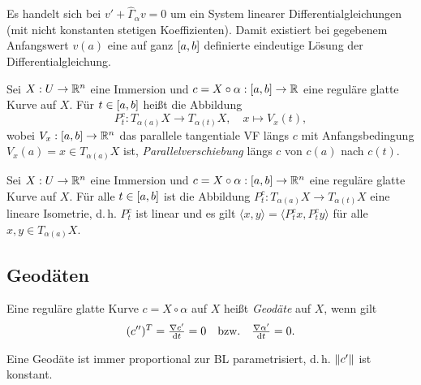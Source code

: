 \documentclass{cheat-sheet}
\begin{document}
\begin{bem}
  Es handelt sich bei $v' + \hat{\Gamma}_\alpha v = 0$ um ein System linearer Differentialgleichungen (mit nicht konstanten stetigen Koeffizienten). Damit existiert bei gegebenem Anfangswert $v(a)$ eine auf ganz $\left[ a, b \right]$ definierte eindeutige Lösung der Differentialgleichung.
\end{bem}

\begin{defn}
  Sei $X : U \to \mathbb{R}^n$ eine Immersion und $c = X \circ \alpha : \left[ a, b \right] \to \mathbb{R}$ eine reguläre glatte Kurve auf $X$. Für $t \in \left[ a, b \right]$ heißt die Abbildung
  \[ P_t^c : T_{\alpha(a)} X \to T_{\alpha(t)} X, \quad x \mapsto V_x(t), \]
  wobei $V_x : \left[ a, b \right] \to \mathbb{R}^n$ das parallele tangentiale VF längs $c$ mit Anfangsbedingung $V_x(a) = x \in T_{\alpha(a)} X$ ist, \emph{Parallelverschiebung} längs $c$ von $c(a)$ nach $c(t)$.
\end{defn}

\begin{samepage}

\begin{satz}
  Sei $X : U \to \mathbb{R}^n$ eine Immersion und $c = X \circ \alpha : \left[ a, b \right] \to \mathbb{R}^n$ eine reguläre glatte Kurve auf $X$. Für alle $t \in \left[ a, b \right]$ ist die Abbildung $P_t^c : T_{\alpha(a)} X \to T_{\alpha(t)} X$ eine lineare Isometrie, d.\,h. $P_t^c$ ist linear und es gilt $\langle x, y \rangle = \langle P_t^c x, P_t^c y \rangle$ für alle $x, y \in T_{\alpha(a)} X$.
\end{satz}


\subsection{Geodäten}

\end{samepage}

\begin{defn}
  Eine reguläre glatte Kurve $c = X \circ \alpha$ auf $X$ heißt \emph{Geodäte} auf $X$, wenn gilt
  \[ (c'')^T = \tfrac{\nabla c'}{\mathrm{d} t} = 0 \quad\text{bzw.}\quad \tfrac{\nabla \alpha'}{\mathrm{d} t} = 0. \]
\end{defn}

\begin{satz}
  Eine Geodäte ist immer proportional zur BL parametrisiert, d.\,h. $\lVert c'\rVert$ ist konstant.
\end{satz}
\end{document}
